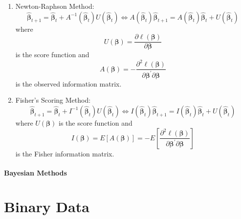 \begin{enumerate}
	\item Newton-Raphson Method:
	      \begin{equation}
		      \hat{\boldsymbol{\beta}}_{t+1}=\hat{\boldsymbol{\beta}}_{t}+A^{-1}\left(\hat{\boldsymbol{\beta}}_{t}\right)U\left(\hat{\boldsymbol{\beta}}_{t}\right)\Leftrightarrow A\left(\hat{\boldsymbol{\beta}}_{t}\right)\hat{\boldsymbol{\beta}}_{t+1}=A\left(\hat{\boldsymbol{\beta}}_{t}\right)\hat{\boldsymbol{\beta}}_{t}+U\left(\hat{\boldsymbol{\beta}}_{t}\right)
	      \end{equation}
	      where
	      \begin{equation}
		      U\left(\boldsymbol{\beta}\right)=\frac{\partial\ell\left(\boldsymbol{\beta}\right)}{\partial\boldsymbol{\beta}}
	      \end{equation}
	      is the score function and
	      \begin{equation}
		      A\left(\boldsymbol{\beta}\right)=-\frac{\partial^{2}\ell\left(\boldsymbol{\beta}\right)}{\partial\boldsymbol{\beta}^{\prime}\partial\boldsymbol{\beta}}
	      \end{equation}
	      is the observed information matrix.
	\item Fisher’s Scoring Method:
	      \begin{equation}
		      \hat{\boldsymbol{\beta}}_{t+1}=\hat{\boldsymbol{\beta}}_{t}+I^{-1}\left(\hat{\boldsymbol{\beta}}_{t}\right)U\left(\hat{\boldsymbol{\beta}}_{t}\right)\Leftrightarrow I\left(\hat{\boldsymbol{\beta}}_{t}\right)\hat{\boldsymbol{\beta}}_{t+1}=I\left(\hat{\boldsymbol{\beta}}_{t}\right)\hat{\boldsymbol{\beta}}_{t}+U\left(\hat{\boldsymbol{\beta}}_{t}\right)
	      \end{equation}
	      where $U\left(\boldsymbol{\beta}\right)$ is the score function and
	      \begin{equation}
		      I\left(\boldsymbol{\beta}\right)=E\left[A\left(\boldsymbol{\beta}\right)\right]=-E\left[\frac{\partial^{2}\ell\left(\boldsymbol{\beta}\right)}{\partial\boldsymbol{\beta}^{\prime}\partial\boldsymbol{\beta}}\right]
	      \end{equation}
	      is the Fisher information matrix.
\end{enumerate}

\paragraph{Bayesian Methods}

\section{Binary Data}

